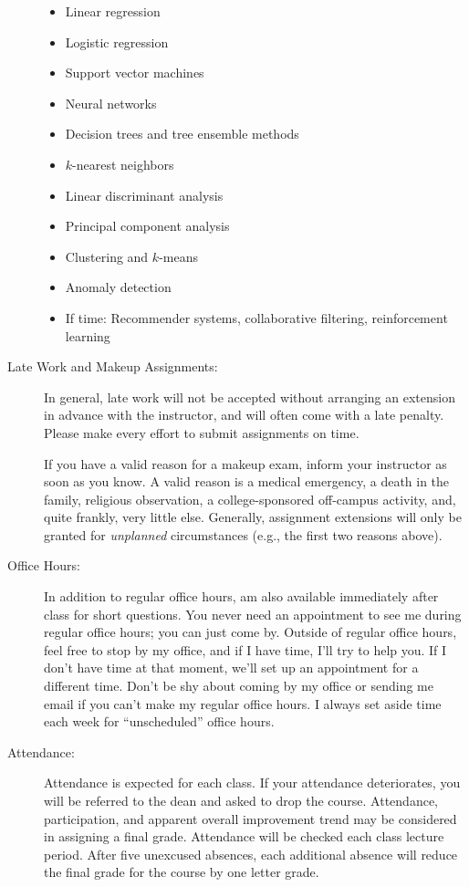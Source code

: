 \documentclass [letterpaper,11pt]{article}
\begin{document}
\begin{description}
\begin{itemize} 
	\item Linear regression
	\item Logistic regression
	\item Support vector machines
	\item Neural networks
	\item Decision trees and tree ensemble methods
	\item $k$-nearest neighbors
	\item Linear discriminant analysis
	\item Principal component analysis
	\item Clustering and $k$-means
	\item Anomaly detection
	\item If time: Recommender systems, collaborative filtering, reinforcement learning
\end{itemize}

\item[Late Work and Makeup Assignments:]
In general, late work will not be accepted without arranging an extension in advance
with the instructor, and will often come with a late penalty.
Please make every effort to submit assignments on time.

If you have a valid reason for a makeup exam, inform your instructor
   as soon as you know.  A valid reason is a medical emergency, a death in the family, 
   religious observation, a college-sponsored off-campus activity, and, quite frankly, 
   very little else.  Generally, assignment extensions will only be granted for 
   \emph{unplanned} circumstances (e.g., the first two reasons above). 
   

\item[Office Hours:]
In addition to regular office hours, am also available immediately after class for
short questions. You never need an appointment to see me during regular office hours; you
can just come by. Outside of regular office hours, feel free to stop by my office, and if I have
time, I'll try to help you. If I don't have time at that moment, we'll set up an appointment
for a different time. Don't be shy about coming by my office or sending me email if you can't
make my regular office hours. I always set aside time each week for ``unscheduled'' office
hours.

\item[Attendance:]
Attendance is expected for each class. If your attendance deteriorates, you will be referred to the dean and asked to drop the course. Attendance, participation, and apparent overall improvement trend may be considered in assigning a final grade.
Attendance will be checked each class lecture period.  After five unexcused absences, each additional absence will reduce the final grade for the course by one letter grade.


\end{description}
\end{document}
